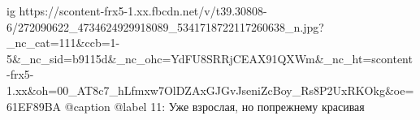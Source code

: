  
 
 
 
 

\ifcmt
  ig https://scontent-frx5-1.xx.fbcdn.net/v/t39.30808-6/272090622_4734624929918089_5341718722117260638_n.jpg?_nc_cat=111&ccb=1-5&_nc_sid=b9115d&_nc_ohc=YdFU8SRRjCEAX91QXWm&_nc_ht=scontent-frx5-1.xx&oh=00_AT8c7_hLfmxw7OlDZAxGJGvJseniZcBoy_Rs8P2UxRKOkg&oe=61EF89BA
  @caption @label 11: Уже взрослая, но попрежнему красивая
\fi
